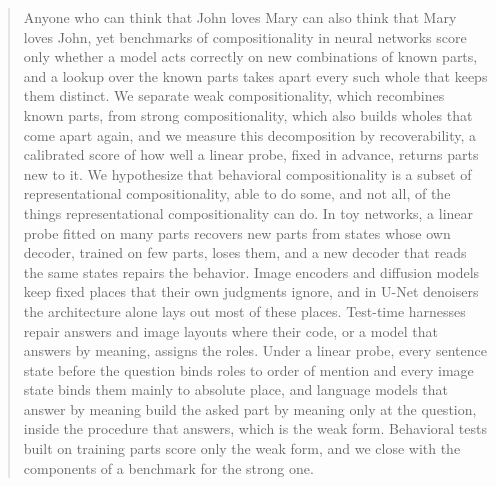 \documentclass{article}
\theoremstyle{plain}
\theoremstyle{remark}
\begin{document}

\printAffiliationsAndNotice{}

\begin{abstract}
Anyone who can think that John loves Mary can also think that Mary loves John, yet benchmarks of compositionality in neural networks score only whether a model acts correctly on new combinations of known parts, and a lookup over the known parts takes apart every such whole that keeps them distinct. We separate weak compositionality, which recombines known parts, from strong compositionality, which also builds wholes that come apart again, and we measure this decomposition by recoverability, a calibrated score of how well a linear probe, fixed in advance, returns parts new to it. We hypothesize that behavioral compositionality is a subset of representational compositionality, able to do some, and not all, of the things representational compositionality can do. In toy networks, a linear probe fitted on many parts recovers new parts from states whose own decoder, trained on few parts, loses them, and a new decoder that reads the same states repairs the behavior. Image encoders and diffusion models keep fixed places that their own judgments ignore, and in U-Net denoisers the architecture alone lays out most of these places. Test-time harnesses repair answers and image layouts where their code, or a model that answers by meaning, assigns the roles. Under a linear probe, every sentence state before the question binds roles to order of mention and every image state binds them mainly to absolute place, and language models that answer by meaning build the asked part by meaning only at the question, inside the procedure that answers, which is the weak form. Behavioral tests built on training parts score only the weak form, and we close with the components of a benchmark for the strong one.
\end{abstract}
\end{document}
